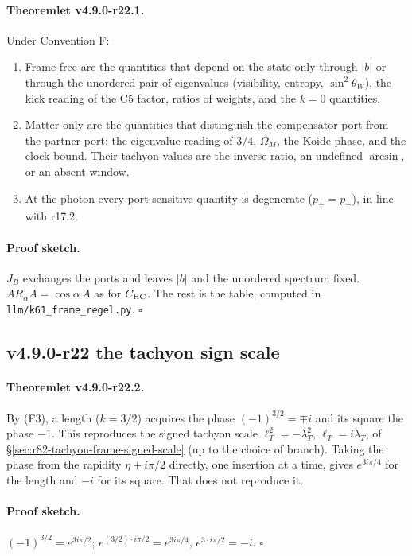 \paragraph{Theoremlet v4.9.0-r22.1.}
Under Convention F:
\begin{enumerate}[leftmargin=2em]
\item[(a)] Frame-free are the quantities that depend on the state only through \(|b|\) or through the unordered pair of
eigenvalues (visibility, entropy, \(\sin^2\theta_W\)), the kick reading of the C5 factor, ratios of weights, and the \(k=0\)
quantities.
\item[(b)] Matter-only are the quantities that distinguish the compensator port from the partner port: the eigenvalue reading
of \(3/4\), \(\Omega_M\), the Koide phase, and the clock bound.  Their tachyon values are the inverse ratio, an undefined
\(\arcsin\), or an absent window.
\item[(c)] At the photon every port-sensitive quantity is degenerate (\(p_+=p_-\)), in line with r17.2.
\end{enumerate}

\paragraph{Proof sketch.}
\(J_B\) exchanges the ports and leaves \(|b|\) and the unordered spectrum fixed.  \(A R_\alpha A=\cos\alpha\,A\) as for \(C_{\mathrm{HC}}\).
The rest is the table, computed in \texttt{llm/k61\_frame\_regel.py}.  \(\square\)

\subsection*{v4.9.0-r22 the tachyon sign scale}
\label{subsec:v490-r22-sign-scale}

\paragraph{Theoremlet v4.9.0-r22.2.}
By (F3), a length (\(k=3/2\)) acquires the phase \((-1)^{3/2}=\mp i\) and its square the phase \(-1\).  This reproduces the signed
tachyon scale \(\ell_T^2=-\lambda_T^2\), \(\ell_T=i\lambda_T\), of \S\ref{sec:r82-tachyon-frame-signed-scale} (up to the choice of
branch).  Taking the phase from the rapidity \(\eta+i\pi/2\) directly, one insertion at a time, gives \(e^{3i\pi/4}\) for the length
and \(-i\) for its square.  That does not reproduce it.

\paragraph{Proof sketch.}
\((-1)^{3/2}=e^{3i\pi/2}\); \(e^{(3/2)\cdot i\pi/2}=e^{3i\pi/4}\), \(e^{3\cdot i\pi/2}=-i\).  \(\square\)

